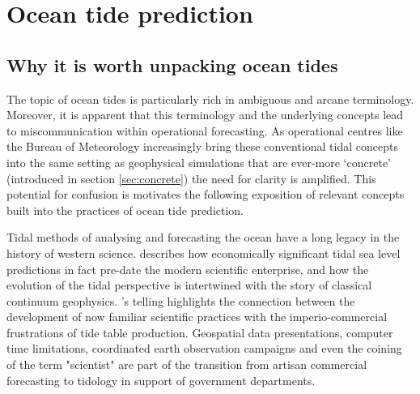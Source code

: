 \section{Ocean tide prediction}
\label{sec:tidesOverview}
\subsection{Why it is worth unpacking ocean tides}
\label{sec:semantics}
The topic of ocean tides is particularly rich in ambiguous and arcane terminology.  
Moreover, it is apparent that this terminology and the underlying concepts lead to miscommunication within operational forecasting.  As operational centres like the Bureau of Meteorology increasingly bring these conventional tidal concepts into the same setting as geophysical simulations that are ever-more `concrete' (introduced in section \ref{sec:concrete}) the need for clarity is amplified.  This potential for confusion is motivates the following exposition of relevant concepts built into the practices of ocean tide prediction.
\newline{}


Tidal methods of analysing and forecasting the ocean have a long legacy in the history of western science.  \citet{reidy_tideshistory}
describes how economically significant tidal sea level predictions in fact pre-date the modern scientific enterprise, and how the evolution of the tidal perspective is intertwined with the story of classical continuum geophysics.   \citeauthor{reidy_tideshistory}'s telling highlights the connection between the development of now familiar scientific practices with the imperio-commercial frustrations of tide table production. Geospatial data presentations, computer time limitations, coordinated earth observation campaigns and even the coining of the term "scientist" are part of the transition from artisan commercial forecasting to tidology in support of government departments.   



